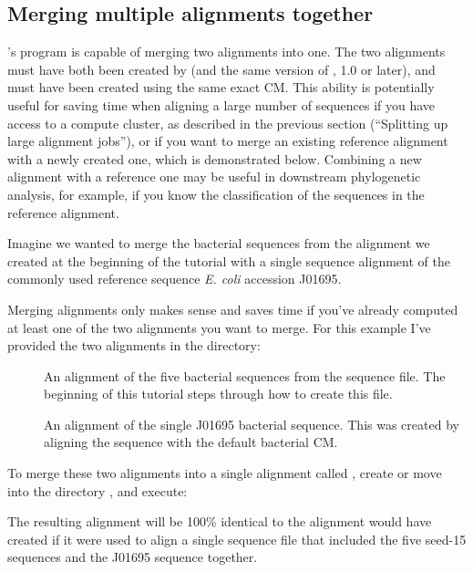 \subsection{Merging multiple alignments together}

's  program is capable of merging
two alignments into one. The two alignments must have both been
created by  (and the same version of , 1.0
or later), and must have been created using the same exact CM. This
ability is potentially useful for saving time when aligning a large
number of sequences if you have access to a compute cluster, as
described in the previous section (``Splitting up large alignment
jobs''), or if you want to merge an existing reference alignment with
a newly created one, which is demonstrated below. Combining a new
alignment with a reference one may be useful in downstream
phylogenetic analysis, for example, if you know the classification of
the sequences in the reference alignment.

Imagine we wanted to merge the bacterial sequences from the 
 alignment we created at the beginning of the tutorial
with a single sequence alignment of the commonly used reference
sequence \emph{E. coli}  accession J01695. 

Merging alignments only makes sense and saves time if you've already
computed at least one of the two alignments you want to merge. For
this example I've provided the two alignments in the
 directory:

\begin{description}
\item[]
  An alignment of the five bacterial sequences from the 
  sequence file. The beginning of this tutorial steps through how to create this file.

\item[]
  An alignment of the single J01695 bacterial sequence. This was
  created by aligning the sequence with the default bacterial CM.
\end{description}

To merge these two alignments into a single alignment called
, create or move
into the directory , and
execute: 


The resulting alignment will be 100\% identical to the alignment
 would have created if it were used to align a single
sequence file that included the five seed-15 sequences and the J01695
sequence together.

